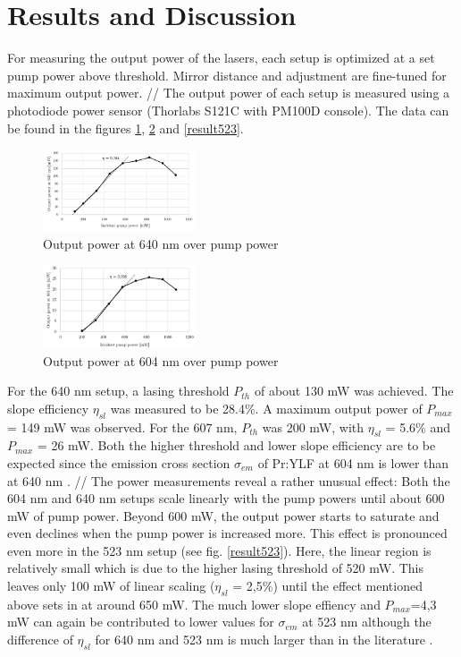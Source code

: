 \documentclass[conference]{IEEEtran}
\begin{document}
\section{Results and Discussion}
For measuring the output power of the lasers, each setup is optimized at a set pump power above threshold. Mirror distance and adjustment are fine-tuned for maximum output power. //
The output power of each setup is measured using a photodiode power sensor (Thorlabs S121C with PM100D console). The data can be found in the figures \ref{result640}, \ref{result604} and \ref{result523}.
 \begin{figure}[h]
	\centering
	\includegraphics[width=0.4\textwidth]{img/measurement640}
	\caption{Output power at 640 nm over pump power}
	\label{result640}
\end{figure}
 \begin{figure}[h]
	\centering
	\includegraphics[width=0.4\textwidth]{img/measurement604}
	\caption{Output power at 604 nm over pump power}
	\label{result604}
\end{figure}
For the 640 nm setup, a lasing threshold $P_{th}$ of about 130 mW was achieved. The slope efficiency $\eta_{sl}$ was measured to be 28.4\%. A maximum output power of $P_{max}$ = 149 mW was observed. For the 607 nm, $P_{th}$ was 200 mW, with $\eta_{sl}$ = 5.6\% and $P_{max}$ = 26 mW. Both the higher threshold and lower slope efficiency are to be expected since the emission cross section $\sigma_{em}$ of Pr:YLF at 604 nm is lower than at 640 nm \cite{Richter.2007}. //
The power measurements reveal a rather unusual effect: Both the 604 nm and 640 nm setups scale linearly with the pump powers until about 600 mW of pump power. Beyond 600 mW, the output power starts to saturate and even declines when the pump power is increased more. This effect is pronounced even more in the 523 nm setup (see fig. \ref{result523}). Here, the linear region is relatively small which is due to the higher lasing threshold of 520 mW. This leaves only 100 mW of linear scaling ($\eta_{sl}$ = 2,5\%) until the effect mentioned above sets in at around 650 mW. The much lower slope effiency and $P_{max}$=4,3 mW can again be contributed to lower values for $\sigma_{em}$ at 523 nm  although the difference of $\eta_{sl}$ for 640 nm and 523 nm is much larger than in the literature \cite{Richter.2007}.
\end{document}
